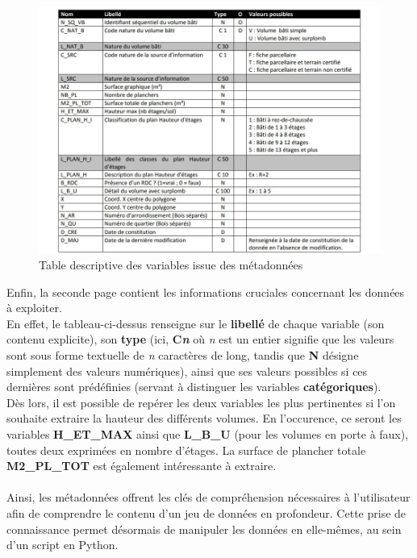 \documentclass[
  11pt,
  french,
]{article}
\begin{document}
\begin{tcolorbox}
\begin{figure}

{\centering \includegraphics[width=0.9\linewidth]{__imgs/odp_meta2} 

}

\caption[Table descriptive des variables issue des métadonnées  -  https://opendata.paris.fr/]{Table descriptive des variables issue des métadonnées}\label{fig:odp_meta_2}
\end{figure}
\end{tcolorbox}

\hfill\break
Enfin, la seconde page contient les informations cruciales concernant
les données à exploiter.\\
En effet, le tableau-ci-dessus renseigne sur le \textbf{libellé} de
chaque variable (son contenu explicite), son \textbf{type} (ici,
\textbf{C\emph{n}} où \emph{n} est un entier signifie que les valeurs
sont sous forme textuelle de \emph{n} caractères de long, tandis que
\textbf{N} désigne simplement des valeurs numériques), ainsi que ses
valeurs possibles si ces dernières sont prédéfinies (servant à
distinguer les variables \textbf{catégoriques}).\\
Dès lors, il est possible de repérer les deux variables les plus
pertinentes si l'on souhaite extraire la hauteur des différents volumes.
En l'occurence, ce seront les variables \textbf{H\_ET\_MAX} ainsi que
\textbf{L\_B\_U} (pour les volumes en porte à faux), toutes deux
exprimées en nombre d'étages. La surface de plancher totale
\textbf{M2\_PL\_TOT} est également intéressante à extraire.\\
~\\
Ainsi, les métadonnées offrent les clés de compréhension nécessaires à
l'utilisateur afin de comprendre le contenu d'un jeu de données en
profondeur. Cette prise de connaissance permet désormais de manipuler
les données en elle-mêmes, au sein d'un script en Python.
\end{document}
